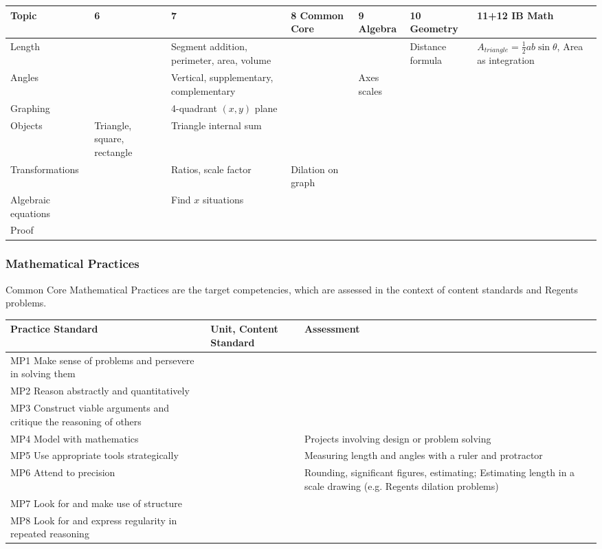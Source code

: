\documentclass[12pt, twoside]{article}
\begin{document}
\begin{tabular}{|p{3cm}|p{2cm}|p{4cm}|p{2cm}|p{2cm}|p{3.5cm}|p{4cm}|}
  \hline
  Topic & 6 & 7 & 8 Common Core & 9 Algebra & 10 Geometry & 11+12 IB Math \\
  \hline \hline
  Length &  & Segment addition, perimeter, area, volume &  &  & Distance formula & $A_{triangle}=\frac{1}{2}ab \sin \theta$, Area as integration \\
  \hline
  Angles &  & Vertical, supplementary, complementary & & Axes scales & & \\
  \hline
  Graphing &  & 4-quadrant $(x,y)$ plane &  &  & & \\
  \hline
  Objects & Triangle, square, rectangle  & Triangle internal sum & & & & \\
  \hline
  Transformations &  & Ratios, scale factor & Dilation on graph  & & & \\
  \hline
  Algebraic equations & & Find $x$ situations & & & & \\
  \hline
  Proof & & & & & & \\
  \hline
\end{tabular}

\newpage
\subsubsection*{Mathematical Practices}

Common Core Mathematical Practices are the target competencies, which are assessed in the context of content standards and Regents problems. \\[0.25in]
\begin{tabular}{|p{6.5cm}|p{5cm}|p{9cm}|}
  \hline
  Practice Standard & Unit, Content Standard & Assessment \\
  \hline
  MP1 Make sense of problems and persevere in solving them & & \\
  \hline
  MP2 Reason abstractly and quantitatively & & \\
  \hline
  MP3 Construct viable arguments and critique the reasoning of others & & \\
  \hline
  MP4 Model with mathematics & & Projects involving design or problem solving \\
  \hline
  MP5 Use appropriate tools strategically & & Measuring length and angles with a ruler and protractor \\
  \hline
  MP6 Attend to precision & & Rounding, significant figures, estimating; Estimating length in a scale drawing (e.g. Regents dilation problems) \\
  \hline
  MP7 Look for and make use of structure & & \\
  \hline
  MP8 Look for and express regularity in repeated reasoning & & \\
  \hline
\end{tabular}
\end{document}
